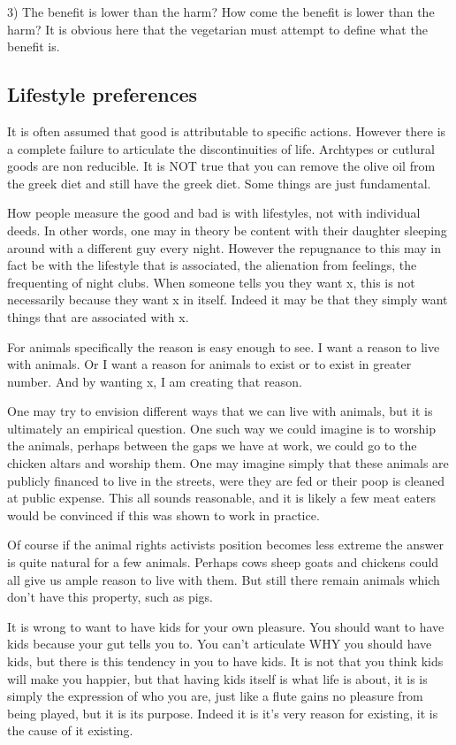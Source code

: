 \documentclass[12pt]{report}
\numberwithin{equation}{section}
\begin{document}
3) The benefit is lower than the harm? How come the benefit is lower than the harm? It is obvious here that the vegetarian must attempt to define what the benefit is. 

\subsection{Lifestyle preferences}

It is often assumed that good is attributable to specific actions. However there is a complete failure to articulate the discontinuities of life. Archtypes or cutlural goods are non reducible. It is NOT true that you can remove the olive oil from the greek diet and still have the greek diet. Some things are just fundamental. 

How people measure the good and bad is with lifestyles, not with individual deeds. In other words, one may in theory be content with their daughter sleeping around with a different guy every night. However the repugnance to this may in fact be with the lifestyle that is associated, the alienation from feelings, the frequenting of night clubs. When someone tells you they want 
 x, this is not necessarily because they want x in itself. Indeed it may be that they simply want things that are associated with x. 

For animals specifically the reason is easy enough to see. I want a reason to live with animals. Or I want a reason for animals to exist or to exist in greater number. And by wanting x, I am creating that reason. 

One may try to envision different ways that we can live with animals, but it is ultimately an empirical question. One such way we could imagine is to worship the animals, perhaps between the gaps we have at work, we could go to the chicken altars and worship them. One may imagine simply that these animals are publicly financed to live in the streets, were they are fed or their poop is cleaned at public expense. This all sounds reasonable, and it is likely a few meat eaters would be convinced if this was shown to work in practice.

Of course if the animal rights activists position becomes less extreme the answer is quite natural for a few animals. Perhaps cows sheep goats and chickens could all give us ample reason to live with them. But still there remain animals which don't have this property, such as pigs. 

It is wrong to want to have kids for your own pleasure. You should want to have kids because your gut tells you to. You can't articulate WHY you should have kids, but there is this tendency in you to have kids. It is not that you think kids will make you happier, but that having kids itself is what life is about, it is is simply the expression of who you are, just like a flute gains no pleasure from being played, but it is its purpose. Indeed it is it's very reason for existing, it is the cause of it existing. 
\end{document}
